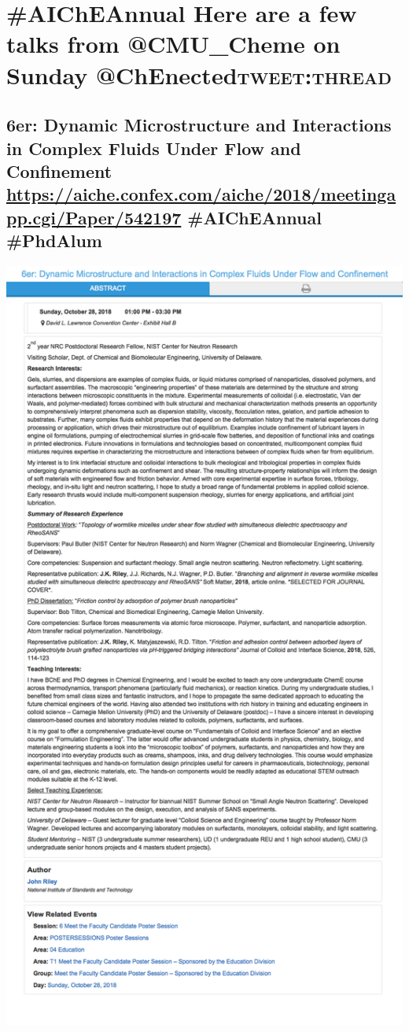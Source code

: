 \documentclass[11pt]{article}
\author{John Kitchin}
\date{\today}
\title{}
\begin{document}
\tableofcontents

\section{\#AIChEAnnual Here are a few talks from @CMU\_Cheme on Sunday @ChEnected\hfill{}\textsc{tweet:thread}}
\label{sec:orgcbb454f}
\subsection{6er: Dynamic Microstructure and Interactions in Complex Fluids Under Flow and Confinement \url{https://aiche.confex.com/aiche/2018/meetingapp.cgi/Paper/542197} \#AIChEAnnual \#PhdAlum}
\label{sec:org1d925f2}
\begin{center}
\includegraphics[width=.9\linewidth]{./542197.png}
\end{center}
\end{document}
